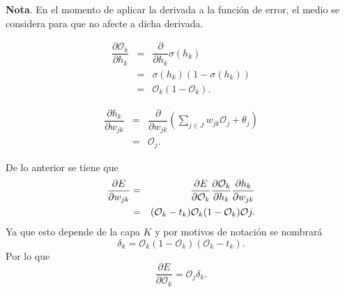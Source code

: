 \documentclass[12pt,letterpaper]{article}
\theoremstyle{definition}
\theoremstyle{definition}
\theoremstyle{definition}
\theoremstyle{definition}
\theoremstyle{definition}
\theoremstyle{definition}
\begin{document}
	\textbf{Nota}. En el momento de aplicar la derivada a la función de error, el medio se considera para que no afecte a dicha derivada.
	\begin{multicols}{2}
		\begin{eqnarray*}
			\boxed{\dfrac{\partial \mathcal{O}_{k}}{\partial h_{k}}}{}&=&\dfrac{\partial} {\partial h_{k}} \sigma(h_{k})\\
			&=&\sigma(h_{k})(1-\sigma(h_{k})) \\
			&=&\mathcal{O}_{k}(1-\mathcal{O}_{k}).
		\end{eqnarray*}
		
		\begin{eqnarray*}
			\boxed{\dfrac{\partial h_{k}}{\partial w_{j k}}}{}&=&\dfrac{\partial}{\partial w_{j k}} \left(  \sum_{j \in J} w_{j k} \mathcal{O}_{j} + \theta_{j} \right)\\
			&=&\mathcal{O}_{j}.
		\end{eqnarray*}
	\end{multicols}
	De lo anterior se tiene que
	\begin{eqnarray*}
		\dfrac{\partial E}{\partial w_{j k}}&=&\textcolor{black}{\dfrac{\partial E}{\partial \mathcal{O}_{k}}}\textcolor{black}{\dfrac{\partial \mathcal{O}_{k}}{\partial h_{k}}} \dfrac{\partial h_{k}}{\partial w_{j k}}\\
		&=&\textcolor{black}{(\mathcal{O}_{k}-t_{k})}\textcolor{black}{\mathcal{O}_{k}(1-\mathcal{O}_{k})}\mathcal{O}{j}.
	\end{eqnarray*}
	Ya que esto depende de la capa $ K $ y por motivos de notación se nombrará
	\[ \delta_{k}= \mathcal{O}_{k}(1-\mathcal{O}_{k})(\mathcal{O}_{k}-t_{k}). \]
	Por lo que
	\[ \dfrac{\partial E}{\partial \mathcal{O}_{k}}= \mathcal{O}_{j}\delta_{k}. \]
	
\end{document}
